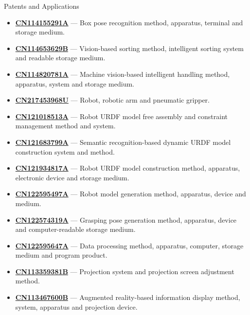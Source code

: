 \documentclass{resume}
\begin{document}
\begin{rSection}{Patents and Applications}
{\fontsize{9.1}{11}\selectfont
\begin{itemize}[itemsep=1pt]
\item \href{https://patents.google.com/patent/CN114155291A/zh}{\textbf{CN114155291A}} --- Box pose recognition method, apparatus, terminal and storage medium.
\item \href{https://patents.google.com/patent/CN114653629B/zh}{\textbf{CN114653629B}} --- Vision-based sorting method, intelligent sorting system and readable storage medium.
\item \href{https://patents.google.com/patent/CN114820781A/zh}{\textbf{CN114820781A}} --- Machine vision-based intelligent handling method, apparatus, system and storage medium.
\item \href{https://patents.google.com/patent/CN217453968U/zh}{\textbf{CN217453968U}} --- Robot, robotic arm and pneumatic gripper.
\item \href{https://patents.google.com/patent/CN121018513A/zh}{\textbf{CN121018513A}} --- Robot URDF model free assembly and constraint management method and system.
\item \href{https://patents.google.com/patent/CN121683799A/zh}{\textbf{CN121683799A}} --- Semantic recognition-based dynamic URDF model construction system and method.
\item \href{https://patents.google.com/patent/CN121934817A/zh}{\textbf{CN121934817A}} --- Robot URDF model construction method, apparatus, electronic device and storage medium.
\item \href{https://patents.google.com/patent/CN122595497A/zh}{\textbf{CN122595497A}} --- Robot model generation method, apparatus, device and medium.
\item \href{https://patents.google.com/patent/CN122574319A/zh}{\textbf{CN122574319A}} --- Grasping pose generation method, apparatus, device and computer-readable storage medium.
\item \href{https://patents.google.com/patent/CN122595647A/zh}{\textbf{CN122595647A}} --- Data processing method, apparatus, computer, storage medium and program product.
\item \href{https://patents.google.com/patent/CN113359381B/zh}{\textbf{CN113359381B}} --- Projection system and projection screen adjustment method.
\item \href{https://patents.google.com/patent/CN113467600B/zh}{\textbf{CN113467600B}} --- Augmented reality-based information display method, system, apparatus and projection device.

\end{itemize}}
\end{rSection}
\end{document}
